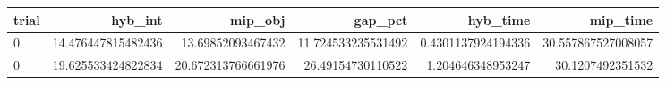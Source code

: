 \begin{tabular}{lrrrrr}
\hline
trial & hyb_int & mip_obj & gap_pct & hyb_time & mip_time \\ \hline
0 & 14.476447815482436 & 13.69852093467432 & 11.724533235531492 & 0.4301137924194336 & 30.557867527008057 \\
0 & 19.625533424822834 & 20.672313766661976 & 26.49154730110522 & 1.204646348953247 & 30.1207492351532 \\
\hline
\end{tabular}
